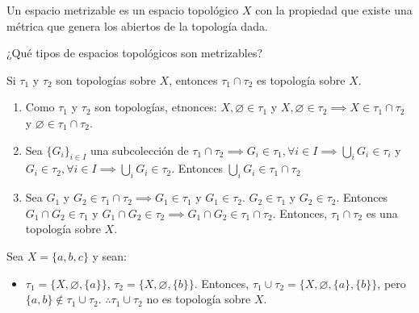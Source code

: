 \begin{cajita}
    \begin{nota}
        Un espacio metrizable es un espacio topológico $X$ con la propiedad que existe una métrica que genera los abiertos de la topología dada. 
    \end{nota}
    \begin{problema}
        ¿Qué tipos de espacios topológicos son metrizables?
    \end{problema}
\end{cajita}

\begin{prop}
    Si $\tau_1$ y $\tau_2$ son topologías sobre $X$, entonces $\tau_1\cap \tau_2$ es topología sobre $X$.
    \begin{dem}
        \begin{enumerate}
            \item Como $\tau_1$ y $\tau_2$ son topologías, etnonces: $X,\varnothing\in \tau_1$ y $X,\varnothing\in \tau_2\implies X\in \tau_1\cap \tau_2$ y $\varnothing\in \tau_1\cap \tau_2$. 
            \item Sea $\{G_i\}_{i\in I}$ una subcolección de $\tau_1\cap \tau_2\implies G_i\in \tau_1,\forall i\in I \implies \bigcup_i G_i\in \tau_i$ y $G_i\in \tau_2,\forall i\in I\implies\bigcup_i G_i\in \tau_2$. Entonces $\bigcup_i G_i\in \tau_1\cap \tau_2$
            \item Sea $G_1$ y $G_2\in \tau_1\cap \tau_2\implies G_1\in\tau_1$ y $G_1\in \tau_2$. $G_2\in \tau_1$ y $G_2\in \tau_2$. Entonces $G_1\cap G_2\in \tau_1$ y $G_1\cap G_2\in \tau_2\implies G_1\cap G_2\in \tau_1\cap\tau_2$. Entonces, $\tau_1\cap \tau_2$ es una topología sobre $X$. 
        \end{enumerate}
        
    \end{dem}
\end{prop}

\begin{nota}
    Sea $X=\{a,b,c\}$ y sean:
    \begin{itemize}
        \item $\tau_1=\{X,\varnothing,\{a\}\}$, $\tau_2=\{X,\varnothing, \{b\}\}$. Entonces, $\tau_1\cup \tau_2=\{X,\varnothing,\{a\},\{b\}\}$, pero $\{a,b\}\not\in \tau_1\cup\tau_2$. $\therefore\tau_1\cup\tau_2$ no es topología sobre $X$.
    \end{itemize}
\end{nota}

